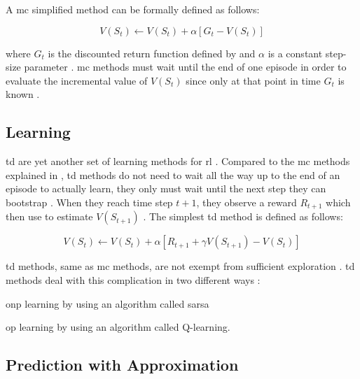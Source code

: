 A \gls{mc} simplified method can be formally defined as follows:

\begin{equation}
\label{eq:mc_update}
	V(S_t) \leftarrow V(S_t) + \alpha [G_t - V(S_t)]
\end{equation}

where $G_t$ is the discounted return function defined by  and $\alpha$ is a constant step-size parameter \citep[p. 127]{Sutton2017}. \gls{mc} methods must wait until the end of one episode in order to evaluate the incremental value of $V(S_t)$ since only at that point in time $G_t$ is known \citep[p. 128]{Sutton2017}.

\subsection{ Learning}
\label{subsec:td_learning}

\gls{td} are yet another set of learning methods for \gls{rl} \citep{Sutton2017}. Compared to the \gls{mc} methods explained in , \gls{td} methods do not need to wait all the way up to the end of an episode to actually learn, they only must wait until the next step \ie they can bootstrap \citep[p. 128]{Sutton2017}. When they reach time step $t+1$, they observe a reward $R_{t+1}$ which then use to estimate $V(S_{t+1})$ \citep[p. 128]{Sutton2017}. The simplest \gls{td} method is defined as follows:

\begin{equation}
\label{eq:td_update}
	V(S_t) \leftarrow V(S_t) + \alpha [R_{t+1} + \gamma V(S_{t+1}) - V(S_t)]
\end{equation}

\gls{td} methods, same as \gls{mc} methods, are not exempt from sufficient exploration \citep[p. 147]{Sutton2017}. \gls{td} methods deal with this complication in two different ways \citep[p. 128]{Sutton2017}:
\begin{enumerate*}
	\item \gls{onp} learning by using an algorithm called \gls{sarsa}
	\item \gls{op} learning by using an algorithm called Q-learning.
\end{enumerate*}

\subsection{ Prediction with Approximation}
\label{subsec:onpol_pred}


